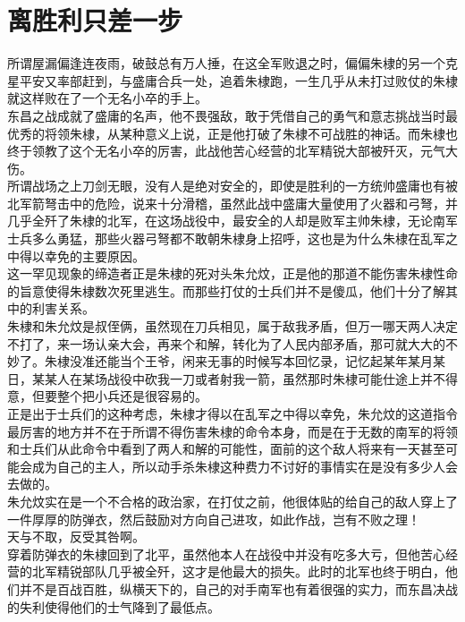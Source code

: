\section{离胜利只差一步}
\ifnum{}
	\begin{multicols}{\theparacolNo}
\fi
所谓屋漏偏逢连夜雨，破鼓总有万人捶，在这全军败退之时，偏偏朱棣的另一个克星平安又率部赶到，与盛庸合兵一处，追着朱棣跑，一生几乎从未打过败仗的朱棣就这样败在了一个无名小卒的手上。\\

东昌之战成就了盛庸的名声，他不畏强敌，敢于凭借自己的勇气和意志挑战当时最优秀的将领朱棣，从某种意义上说，正是他打破了朱棣不可战胜的神话。而朱棣也终于领教了这个无名小卒的厉害，此战他苦心经营的北军精锐大部被歼灭，元气大伤。\\

所谓战场之上刀剑无眼，没有人是绝对安全的，即使是胜利的一方统帅盛庸也有被北军箭弩击中的危险，说来十分滑稽，虽然此战中盛庸大量使用了火器和弓弩，并几乎全歼了朱棣的北军，在这场战役中，最安全的人却是败军主帅朱棣，无论南军士兵多么勇猛，那些火器弓弩都不敢朝朱棣身上招呼，这也是为什么朱棣在乱军之中得以幸免的主要原因。\\

这一罕见现象的缔造者正是朱棣的死对头朱允炆，正是他的那道不能伤害朱棣性命的旨意使得朱棣数次死里逃生。而那些打仗的士兵们并不是傻瓜，他们十分了解其中的利害关系。\\

朱棣和朱允炆是叔侄俩，虽然现在刀兵相见，属于敌我矛盾，但万一哪天两人决定不打了，来一场认亲大会，再来个和解，转化为了人民内部矛盾，那可就大大的不妙了。朱棣没准还能当个王爷，闲来无事的时候写本回忆录，记忆起某年某月某日，某某人在某场战役中砍我一刀或者射我一箭，虽然那时朱棣可能仕途上并不得意，但要整个把小兵还是很容易的。\\

正是出于士兵们的这种考虑，朱棣才得以在乱军之中得以幸免，朱允炆的这道指令最厉害的地方并不在于所谓不得伤害朱棣的命令本身，而是在于无数的南军的将领和士兵们从此命令中看到了两人和解的可能性，面前的这个敌人将来有一天甚至可能会成为自己的主人，所以动手杀朱棣这种费力不讨好的事情实在是没有多少人会去做的。\\

朱允炆实在是一个不合格的政治家，在打仗之前，他很体贴的给自己的敌人穿上了一件厚厚的防弹衣，然后鼓励对方向自己进攻，如此作战，岂有不败之理！\\

天与不取，反受其咎啊。\\

穿着防弹衣的朱棣回到了北平，虽然他本人在战役中并没有吃多大亏，但他苦心经营的北军精锐部队几乎被全歼，这才是他最大的损失。此时的北军也终于明白，他们并不是百战百胜，纵横天下的，自己的对手南军也有着很强的实力，而东昌决战的失利使得他们的士气降到了最低点。\\


\end{multicols}
